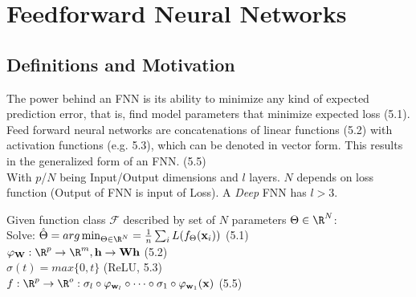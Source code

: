 \documentclass[english]{latex4ei/latex4ei_sheet}
\begin{document}
\section{Feedforward Neural Networks}
\begin{sectionbox}
\subsection{Definitions and Motivation}
The power behind an FNN is its ability to minimize any kind of expected prediction error, that is, find model parameters that minimize expected loss (5.1). Feed forward neural networks are concatenations of linear functions (5.2) with activation functions (e.g. 5.3), which can be denoted in vector form. This results in the generalized form of an FNN. (5.5)\\
With $p$/$N$ being Input/Output dimensions and $l$ layers. $N$ depends on loss function (Output of FNN is input of Loss). A \emph{Deep} FNN has $l>3$.
\begin{emphbox}
    Given function class $\mathcal{F}$ described by set of $N$ parameters $\Theta\in\R^N$:\\
    Solve: $\hat{\Theta}=arg\min_{\Theta\in\R^N}=\frac{1}{n}\sum_iL(f_\Theta(\mathbf{x}_i))$ (5.1)\\
    $\varphi_\mathbf{W}:\R^p\to \R^m, \mathbf{h}\to \mathbf{Wh}$ (5.2)\\
    $\sigma(t)=max\{0,t\}$ (ReLU, 5.3)\\
    $f:\R^p \rightarrow \R^o: \sigma_l\circ\varphi_{\mathbf{w}_l}\circ\cdots\circ\sigma_1\circ\varphi_{\mathbf{w}_1}(\mathbf{x})$ (5.5)
\end{emphbox}

\end{sectionbox}
\end{document}
